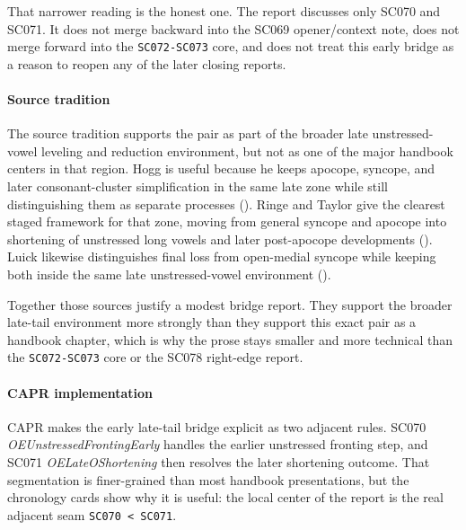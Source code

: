 \documentclass[
  british,
  a4paper,
]{article}
\begin{document}
That narrower reading is the honest one. The report discusses only SC070
and SC071. It does not merge backward into the SC069 opener/context
note, does not merge forward into the \texttt{SC072-SC073} core, and
does not treat this early bridge as a reason to reopen any of the later
closing reports.

\paragraph{Source tradition}\label{source-tradition-44}

The source tradition supports the pair as part of the broader late
unstressed-vowel leveling and reduction environment, but not as one of
the major handbook centers in that region. Hogg is useful because he
keeps apocope, syncope, and later consonant-cluster simplification in
the same late zone while still distinguishing them as separate processes
(). Ringe and Taylor give the
clearest staged framework for that zone, moving from general syncope and
apocope into shortening of unstressed long vowels and later post-apocope
developments (). Luick likewise distinguishes final
loss from open-medial syncope while keeping both inside the same late
unstressed-vowel environment ().

Together those sources justify a modest bridge report. They support the
broader late-tail environment more strongly than they support this exact
pair as a handbook chapter, which is why the prose stays smaller and
more technical than the \texttt{SC072-SC073} core or the SC078
right-edge report.

\paragraph{CAPR implementation}\label{capr-implementation-44}

CAPR makes the early late-tail bridge explicit as two adjacent rules.
SC070 \emph{OEUnstressedFrontingEarly} handles the earlier unstressed
fronting step, and SC071 \emph{OELateOShortening} then resolves the
later shortening outcome. That segmentation is finer-grained than most
handbook presentations, but the chronology cards show why it is useful:
the local center of the report is the real adjacent seam
\texttt{SC070\ \textless{}\ SC071}.
\end{document}
